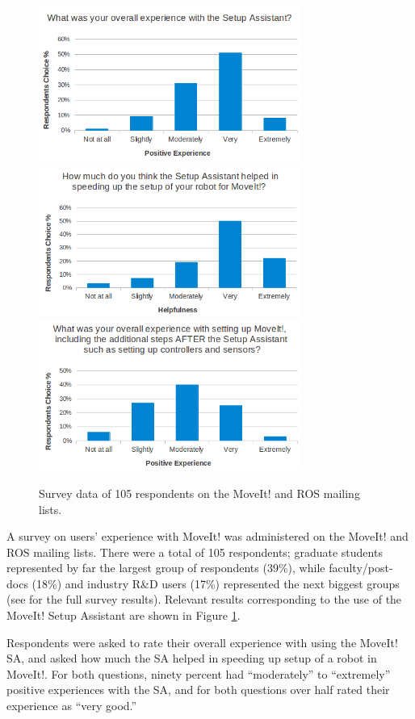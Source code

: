 \documentclass[10pt,journal,compsoc]{joser1}
\begin{document}
{\begin{figure}[!t]
\centering
\includegraphics[width=3.4in]{coleman_20131110_f14}
\includegraphics[width=3.4in]{coleman_20131110_f15}
\includegraphics[width=3.4in]{coleman_20131110_f16}
\caption{Survey data of 105 respondents on the MoveIt! and ROS mailing lists.}
\label{fig:setup_assistant_positive}
\end{figure} 

A survey on users' experience with MoveIt! was administered on the MoveIt! and
ROS mailing lists. There were a total of 105 respondents; graduate students
represented by far the largest group of respondents (39\%), while
faculty/post-docs (18\%) and industry R\&D users (17\%) represented the next
biggest groups (see \cite{moveit} for the full survey results). Relevant results
corresponding to the use of the MoveIt! Setup Assistant are shown in Figure
\ref{fig:setup_assistant_positive}. 

Respondents were asked to rate their overall experience with using the MoveIt!
SA, and asked how much the SA helped in speeding up setup of a robot in MoveIt!.
For both questions, ninety percent had ``moderately'' to ``extremely'' positive
experiences with the SA, and for both questions over half rated their experience
as ``very good.''

}
\end{document}
